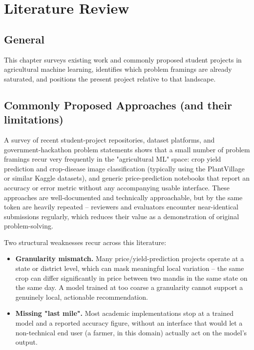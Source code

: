 \chapter{Literature Review}

\section{General}
This chapter surveys existing work and commonly proposed student projects
in agricultural machine learning, identifies which problem framings are
already saturated, and positions the present project relative to that
landscape.

\section{Commonly Proposed Approaches (and their limitations)}
A survey of recent student-project repositories, dataset platforms, and
government-hackathon problem statements shows that a small number of
problem framings recur very frequently in the "agricultural ML" space:
crop yield prediction and crop-disease image classification (typically
using the PlantVillage or similar Kaggle datasets), and generic
price-prediction notebooks that report an accuracy or error metric
without any accompanying usable interface. These approaches are
well-documented and technically approachable, but by the same token are
heavily repeated -- reviewers and evaluators encounter near-identical
submissions regularly, which reduces their value as a demonstration of
original problem-solving.

Two structural weaknesses recur across this literature:
\begin{itemize}
    \item \textbf{Granularity mismatch.} Many price/yield-prediction
    projects operate at a state or district level, which can mask
    meaningful local variation -- the same crop can differ significantly
    in price between two mandis in the same state on the same day. A
    model trained at too coarse a granularity cannot support a genuinely
    local, actionable recommendation.
    \item \textbf{Missing "last mile".} Most academic implementations stop
    at a trained model and a reported accuracy figure, without an
    interface that would let a non-technical end user (a farmer, in this
    domain) actually act on the model's output.
\end{itemize}

